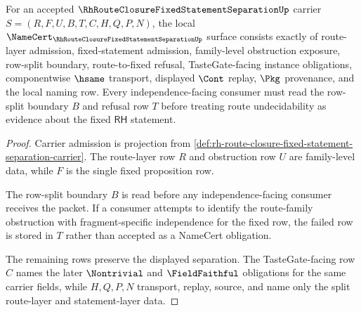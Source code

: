 \begin{theorem}
\label{thm:rh-route-closure-fixed-statement-separation-namecert-obligations}
For an accepted $\RhRouteClosureFixedStatementSeparationUp$ carrier $S=(R,F,U,B,T,C,H,Q,P,N)$, the local $\NameCert_{\RhRouteClosureFixedStatementSeparationUp}$ surface consists exactly of route-layer admission, fixed-statement admission, family-level obstruction exposure, row-split boundary, route-to-fixed refusal, TasteGate-facing instance obligations, componentwise $\hsame$ transport, displayed $\Cont$ replay, $\Pkg$ provenance, and the local naming row. Every independence-facing consumer must read the row-split boundary $B$ and refusal row $T$ before treating route undecidability as evidence about the fixed $\mathsf{RH}$ statement.
\end{theorem}
\begin{proof}
Carrier admission is projection from \autoref{def:rh-route-closure-fixed-statement-separation-carrier}. The route-layer row $R$ and obstruction row $U$ are family-level data, while $F$ is the single fixed proposition row.

The row-split boundary $B$ is read before any independence-facing consumer receives the packet. If a consumer attempts to identify the route-family obstruction with fragment-specific independence for the fixed row, the failed row is stored in $T$ rather than accepted as a NameCert obligation.

The remaining rows preserve the displayed separation. The TasteGate-facing row $C$ names the later $\Nontrivial$ and $\FieldFaithful$ obligations for the same carrier fields, while $H,Q,P,N$ transport, replay, source, and name only the split route-layer and statement-layer data.
\end{proof}



